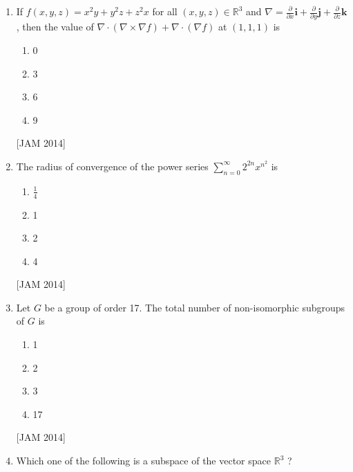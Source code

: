 \begin{enumerate}
\begin{enumerate}
 \item $b=2, c=2 a$ 
\item $b=4, c=2$ 
\item $b=2, c=4$ 
\item $b=2, a=2 c$
\end{enumerate}
\hfill [JAM 2014]



\item  If $f(x, y, z)=x^{2} y+y^{2} z+z^{2} x$ for all $(x, y, z) \in \mathbb{R}^{3}$ and $\nabla=\frac{\partial}{\partial x} \mathbf{i}+\frac{\partial}{\partial y} \mathbf{j}+\frac{\partial}{\partial z} \mathbf{k}$, then the value of $\nabla \cdot(\nabla \times \nabla f)+\nabla \cdot(\nabla f)$ at $(1,1,1)$ is 

\begin{enumerate}
 \item 0 
\item 3 
\item 6 
\item 9
\end{enumerate}
\hfill [JAM 2014]



\item  The radius of convergence of the power series $\sum_{n=0}^{\infty} 2^{2 n} x^{n^{2}}$ is 

\begin{enumerate}
 \item $\frac{1}{4}$ 
\item 1 
\item 2 
\item 4
\end{enumerate}
\hfill [JAM 2014]



\item  Let $G$ be a group of order 17. The total number of non-isomorphic subgroups of $G$ is 

\begin{enumerate}
 \item 1 
\item 2 
\item 3 
\item 17
\end{enumerate}
\hfill [JAM 2014]



\item  Which one of the following is a subspace of the vector space $\mathbb{R}^{3}$ ? 


\end{enumerate}

